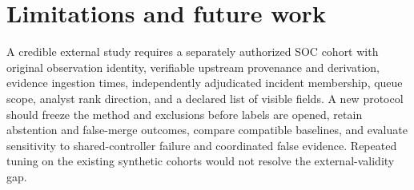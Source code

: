 \section{Limitations and future work}
A credible external study requires a separately authorized SOC cohort with original observation identity, verifiable upstream provenance and derivation, evidence ingestion times, independently adjudicated incident membership, queue scope, analyst rank direction, and a declared list of visible fields. A new protocol should freeze the method and exclusions before labels are opened, retain abstention and false-merge outcomes, compare compatible baselines, and evaluate sensitivity to shared-controller failure and coordinated false evidence. Repeated tuning on the existing synthetic cohorts would not resolve the external-validity gap.
